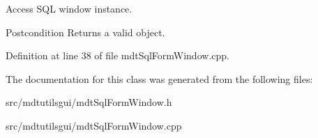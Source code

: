 Access SQL window instance. 

\begin{DoxyPostcond}{Postcondition}
Returns a valid object. 
\end{DoxyPostcond}


Definition at line 38 of file mdtSqlFormWindow.cpp.



The documentation for this class was generated from the following files:\begin{DoxyCompactItemize}
\item 
src/mdtutilsgui/mdtSqlFormWindow.h\item 
src/mdtutilsgui/mdtSqlFormWindow.cpp\end{DoxyCompactItemize}
